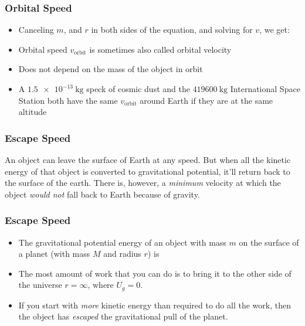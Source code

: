 \documentclass[12pt,compress,aspectratio=169]{beamer}
\begin{document}
\begin{frame}
  \frametitle{Orbital Speed}
  \begin{itemize}
  \item Canceling $m$, and $r$ in both sides of the equation, and solving for
    $v$, we get:
    
  \item Orbital speed $v_\mathrm{orbit}$ is sometimes also called orbital
    velocity
  \item Does not depend on the mass of the object in orbit
  \item A $\SI{1.5e-13}{\kg}$ speck of cosmic dust and the $\SI{419600}{\kg}$
    International Space Station both have the same $v_\mathrm{orbit}$ around
    Earth if they are at the same altitude
  \end{itemize}
\end{frame}


\begin{frame}
  \frametitle{Escape Speed}
  An object can leave the surface of Earth at any speed. But when all the
  kinetic energy of that object is converted to gravitational potential, it'll
  return back to the surface of the earth. There is, however, a \emph{minimum}
  velocity at which the object \emph{would not} fall back to Earth because of
  gravity.
\end{frame}


\begin{frame}
  \frametitle{Escape Speed}
  \begin{itemize}
  \item The gravitational potential energy of an object with mass $m$ on the
    surface of a planet (with mass $M$ and radius $r$) is

  \item The most amount of work that you can do is to bring it to the other side
    of the universe $r=\infty$, where $U_g=0$.
  \item If you start with \emph{more} kinetic energy than required to do all
    the work, then the object has \emph{escaped} the gravitational pull of the
    planet.
  \end{itemize}
\end{frame}
\end{document}
